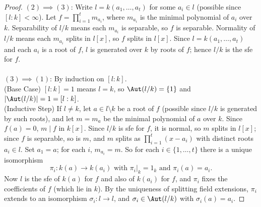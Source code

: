 \documentclass[a4paper,12pt]{article}
\begin{document}
\begin{proof}
    $(2)\implies (3)$: Write $l=k(a_1,\dots,a_t)$ for some $a_i\in l$ (possible since $[l:k]<\infty$). Let $f=\prod_{i=1}^t m_{a_i}$, where $m_{a_i}$ is the minimal polynomial of $a_i$ over $k$. Separability of $l/k$ means each $m_{a_i}$ is separable, so $f$ is separable. Normality of $l/k$ means each $m_{a_i}$ splits in $l[x]$, so $f$ splits in $l[x]$. Since $l=k(a_1,\dots,a_t)$ and each $a_i$ is a root of $f$, $l$ is generated over $k$ by roots of $f$; hence $l/k$ is the sfe for $f$.\\\\
    $(3)\implies (1)$: By induction on $[l:k]$. \\
    (Base Case) $[l:k]=1$ means $l=k$, so $\Aut(l/k)=\{1\}$ and $|\Aut(l/k)|=1=[l:k]$.\\
    (Inductive Step) If $l\neq k$, let $a\in l\setminus k$ be a root of $f$ (possible since $l/k$ is generated by such roots), and let $m=m_a$ be the minimal polynomial of $a$ over $k$. Since $f(a)=0$, $m\mid f$ in $k[x]$. Since $l/k$ is sfe for $f$, it is normal, so $m$ splits in $l[x]$; since $f$ is separable, so is $m$, and $m$ splits as $\prod_{i=1}^t(x-a_i)$ with distinct roots $a_i\in l$. Set $a_1=a$; for each $i$, $m_{a_i}=m$. So for each $i\in\{1,\dots,t\}$ there is a unique isomorphism
    \[
    \pi_i:k(a)\to k(a_i) \text{ with } \pi_i|_k=1_k \text{ and } \pi_i(a)=a_i.
    \]
    Now $l$ is the sfe of $k(a)$ for $f$ and also of $k(a_i)$ for $f$, and $\pi_i$ fixes the coefficients of $f$ (which lie in $k$). By the uniqueness of splitting field extensions, $\pi_i$ extends to an isomorphism $\sigma_i:l\to l$, and $\sigma_i\in\Aut(l/k)$ with $\sigma_i(a)=a_i$.
    

\end{proof}
\end{document}
